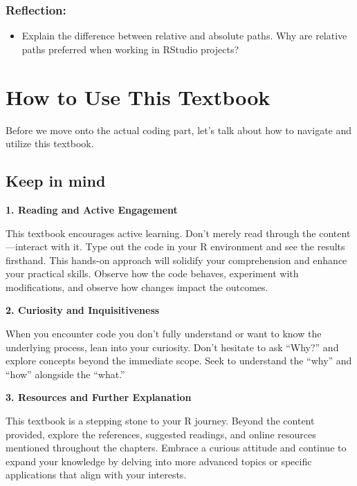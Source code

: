 \documentclass[
]{book}
\providecommand{\tightlist}{%
  \setlength{\itemsep}{0pt}\setlength{\parskip}{0pt}}
\begin{document}
\hypertarget{reflection-1}{%
\subsection{Reflection:}\label{reflection-1}}

\begin{itemize}
\tightlist
\item
  Explain the difference between relative and absolute paths. Why are relative paths preferred when working in RStudio projects?
\end{itemize}

\hypertarget{how-to-use-this-textbook}{%
\chapter{How to Use This Textbook}\label{how-to-use-this-textbook}}

Before we move onto the actual coding part, let's talk about how to navigate and utilize this textbook.

\hypertarget{keep-in-mind}{%
\section{Keep in mind}\label{keep-in-mind}}

\textbf{1. Reading and Active Engagement}

This textbook encourages active learning. Don't merely read through the content---interact with it. Type out the code in your R environment and see the results firsthand. This hands-on approach will solidify your comprehension and enhance your practical skills. Observe how the code behaves, experiment with modifications, and observe how changes impact the outcomes.

\textbf{2. Curiosity and Inquisitiveness}

When you encounter code you don't fully understand or want to know the underlying process, lean into your curiosity. Don't hesitate to ask ``Why?'' and explore concepts beyond the immediate scope. Seek to understand the ``why'' and ``how'' alongside the ``what.''

\textbf{3. Resources and Further Explanation}

This textbook is a stepping stone to your R journey. Beyond the content provided, explore the references, suggested readings, and online resources mentioned throughout the chapters. Embrace a curious attitude and continue to expand your knowledge by delving into more advanced topics or specific applications that align with your interests.
\end{document}
